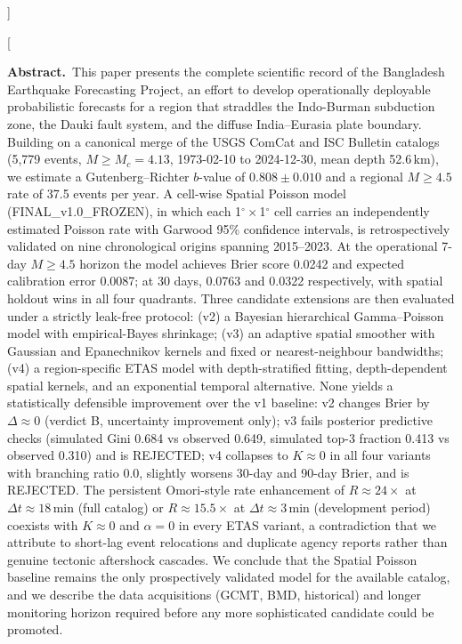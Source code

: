 \documentclass[10pt,a4paper,twocolumn]{article}
\begin{document}
]

\twocolumn[
\begin{@twocolumnfalse}
\noindent\textbf{\color{accent}Abstract.}\,%
This paper presents the complete scientific record of the Bangladesh Earthquake Forecasting Project, an effort to develop operationally deployable probabilistic forecasts for a region that straddles the Indo-Burman subduction zone, the Dauki fault system, and the diffuse India--Eurasia plate boundary. Building on a canonical merge of the USGS ComCat and ISC Bulletin catalogs (5{,}779 events, $M\geq M_c=4.13$, 1973-02-10 to 2024-12-30, mean depth 52.6\,km), we estimate a Gutenberg--Richter $b$-value of $0.808\pm0.010$ and a regional $M\geq4.5$ rate of 37.5 events per year. A cell-wise Spatial Poisson model (FINAL\_v1.0\_FROZEN), in which each 1$^\circ\times$1$^\circ$ cell carries an independently estimated Poisson rate with Garwood 95\% confidence intervals, is retrospectively validated on nine chronological origins spanning 2015--2023. At the operational 7-day $M\geq4.5$ horizon the model achieves Brier score 0.0242 and expected calibration error 0.0087; at 30 days, 0.0763 and 0.0322 respectively, with spatial holdout wins in all four quadrants. Three candidate extensions are then evaluated under a strictly leak-free protocol: (v2) a Bayesian hierarchical Gamma--Poisson model with empirical-Bayes shrinkage; (v3) an adaptive spatial smoother with Gaussian and Epanechnikov kernels and fixed or nearest-neighbour bandwidths; (v4) a region-specific ETAS model with depth-stratified fitting, depth-dependent spatial kernels, and an exponential temporal alternative. None yields a statistically defensible improvement over the v1 baseline: v2 changes Brier by $\Delta\approx0$ (verdict B, uncertainty improvement only); v3 fails posterior predictive checks (simulated Gini 0.684 vs observed 0.649, simulated top-3 fraction 0.413 vs observed 0.310) and is REJECTED; v4 collapses to $K\approx0$ in all four variants with branching ratio 0.0, slightly worsens 30-day and 90-day Brier, and is REJECTED. The persistent Omori-style rate enhancement of $R\approx24\times$ at $\Delta t\approx18$\,min (full catalog) or $R\approx15.5\times$ at $\Delta t\approx3$\,min (development period) coexists with $K\approx0$ and $\alpha=0$ in every ETAS variant, a contradiction that we attribute to short-lag event relocations and duplicate agency reports rather than genuine tectonic aftershock cascades. We conclude that the Spatial Poisson baseline remains the only prospectively validated model for the available catalog, and we describe the data acquisitions (GCMT, BMD, historical) and longer monitoring horizon required before any more sophisticated candidate could be promoted.


\end{@twocolumnfalse}
\end{document}
